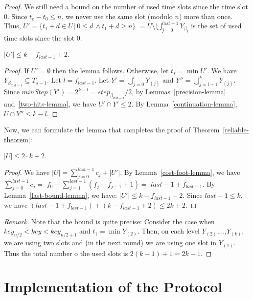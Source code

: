 \documentclass{llncs}
\begin{document}
\begin{proof}
We still need a bound on the number of used time slots since the time slot 0.
Since $t_e-t_0\le n$, we never use the same slot (modulo $n$) more than once.
Thus, 
$U'= \{ t_1+d\in U\,|\, 0\le d \,\wedge t_1+d\ge n \}$
$= U\setminus \bigcup_{j=0}^{last-1} Y_{\beta_j}$ is
the set of used time slots since the slot 0.
%
\begin{lemma}\label{last-bound-lemma}
$|U'|\le k-f_{last-1}+2$.
\end{lemma}
\begin{proof}
If $U'=\emptyset$ then the lemma follows.
Otherwise, let $t_s=\min U'$.
We have $Y_{\beta_{last-1}}\subseteq T_{s-1}$.
Let $l=f_{last-1}$.
Let $Y'=\bigcup_{j=0}^{l} Y_{(j)}$ and $Y''=\bigcup_{j=l+1}^k Y_{(j)}$.
Since $minStep(Y')=2^{k-l}=step_{\beta_{last-1}}/2$, 
by Lemmas~\ref{precision-lemma} and~\ref{two-hits-lemma},
we have $U'\cap Y'\le 2$.
By Lemma~\ref{continuation-lemma}, 
$U\cap Y''\le k-l$.
\end{proof}

Now, we can formulate the lemma that completes the proof of Theorem~\ref{reliable-theorem}:
\begin{lemma}\label{energy-lemma}
$|U|\le 2\cdot k+2$.
\end{lemma}

\begin{proof}
We have $|U|= \sum_{j=0}^{last-1} c_j + |U'|$.
By Lemma~\ref{cost-foot-lemma}, we have
$\sum_{j=0}^{last-1} c_j=$ 
$f_0+\sum_{j=1}^{last-1}(f_j-f_{j-1}+1)=$
$last-1+f_{last-1}$.
By Lemma~\ref{last-bound-lemma}, we have:
$|U'|\le k-f_{last-1}+2$.
Since $last-1\le k$, we have
$(last-1+f_{last-1})+(k-f_{last-1}+2)\le 2k+2$.
\end{proof}

{\em Remark.}
Note that the bound is quite precise:
Consider the case when $key_{n/2}<key<key_{n/2+1}$
and $t_1=\min Y_{(2)}$.
Then, on each level $Y_{(2)}$,$\ldots$,$Y_{(k)}$,
we are using two slots and (in the next round) 
we are using one slot in $Y_{(1)}$.
Thus the total number o the used slots is $2(k-1)+1=2k-1$. 
\end{proof} %


\section{Implementation of the Protocol}\label{implementation-section}
\end{document}
